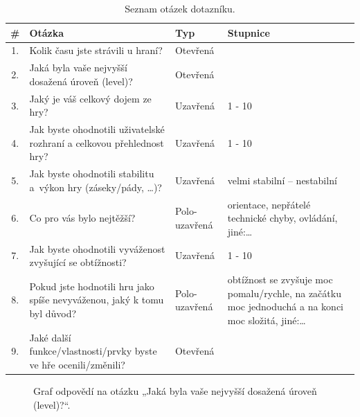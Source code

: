 \begin{table}[h]
    \centering
    \renewcommand{\arraystretch}{1.3}
    \begin{tabularx}{\textwidth}{c|X|l|X}
    \hline
    \textbf{\#} & \textbf{Otázka} & \textbf{Typ} & \textbf{Stupnice} \\ \hline
    1. & Kolik času jste strávili u hraní? & Otevřená & \\ 
    2. & Jaká byla vaše nejvyšší dosažená úroveň (level)? & Otevřená &  \\ 
    3. & Jaký je váš celkový dojem ze hry? & Uzavřená &  1 - 10 \\ 
    4. & Jak byste ohodnotili uživatelské rozhraní a celkovou přehlednost hry? & Uzavřená & 1 - 10\\ 
    5. & Jak byste ohodnotili stabilitu a~výkon hry (záseky/pády, \ldots)? & Uzavřená & velmi stabilní – nestabilní\\ 
    6. & Co pro vás bylo nejtěžší? & Polo-uzavřená & orientace, nepřátelé technické chyby, ovládání, jiné:\ldots \\ 
    7. & Jak byste ohodnotili vyváženost zvyšující se obtížnosti? & Uzavřená &  1 - 10 \\ 
    8. & Pokud jste hodnotili hru jako spíše nevyváženou, jaký k tomu byl důvod? & Polo-uzavřená & obtížnost se zvyšuje moc pomalu/rychle, na začátku moc jednoduchá a na konci moc složitá, jiné:\ldots \\ 
    9. & Jaké další funkce/vlastnosti/prvky byste ve hře ocenili/změnili? & Otevřená & \\
    \hline
    \end{tabularx}
    \caption{Seznam otázek dotazníku.}
    \label{tab:questions}
\end{table}

\begin{figure}[ht]
    \centering
    \caption{Graf odpovědí na otázku „Jaká byla vaše nejvyšší dosažená úroveň (level)?“.}
    \label{fig:nejvyssi_uroven}
\end{figure}

